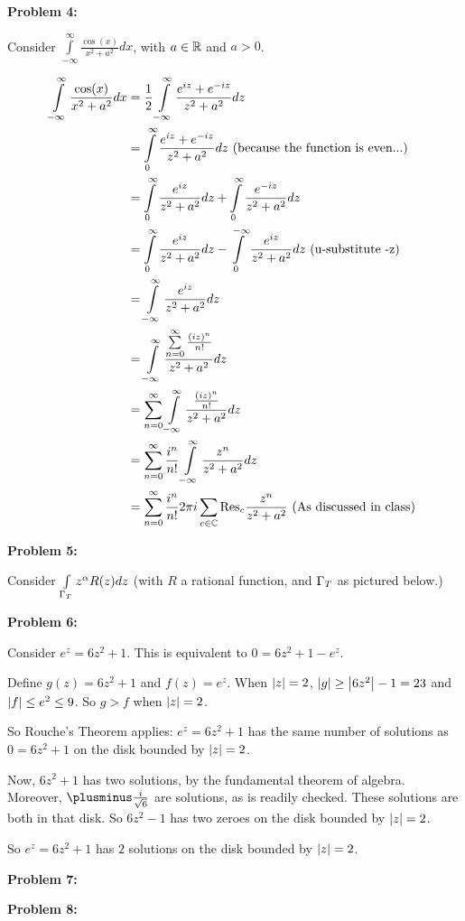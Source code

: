 \documentclass[a4paper,12pt]{article}
\begin{document}
\shunt

{\bf Problem 4:}

Consider $\int\limits_{-\infty}^\infty \frac{\cos(x)}{x^2+a^2} dx$, with $a \in \mathbb{R}$ and $a > 0$.

\begin{align*}
\int\limits_{-\infty}^\infty \frac{\cos(x)}{x^2+a^2} dx &= \frac{1}{2} \int\limits_{-\infty}^\infty \frac{e^{iz}+e^{-iz}}{z^2+a^2}dz\\
&=\int\limits_{0}^\infty \frac{e^{iz}+e^{-iz}}{z^2+a^2}dz \text{ (because the function is even...)}\\
&= \int\limits_{0}^\infty \frac{e^{iz}}{z^2+a^2}dz + \int\limits_{0}^\infty \frac{e^{-iz}}{z^2+a^2}dz\\
&= \int\limits_{0}^\infty \frac{e^{iz}}{z^2+a^2}dz - \int\limits_{0}^{-\infty} \frac{e^{iz}}{z^2+a^2}dz \text{ (u-substitute -z)} \\
&= \int\limits_{-\infty}^\infty \frac{e^{iz}}{z^2+a^2}dz \\
&= \int\limits_{-\infty}^\infty \frac{\sum\limits_{n=0}^\infty \frac{(iz)^n}{n!}}{z^2+a^2}dz \\
&= \sum\limits_{n=0}^\infty \int\limits_{-\infty}^\infty \frac{\frac{(iz)^n}{n!}}{z^2+a^2}dz \\
&= \sum\limits_{n=0}^\infty \frac{i^n}{n!} \int\limits_{-\infty}^\infty \frac{z^n}{z^2+a^2}dz \\
&= \sum\limits_{n=0}^\infty \frac{i^n}{n!} 2\pi i \sum\limits_{c \in \mathbb{C}} \text{Res}_c \frac{z^n}{z^2+a^2} \text{ (As discussed in class) } \\
\end{align*} %

\shunt

{\bf Problem 5:}

Consider $\int\limits_{\Gamma_T} z^\alpha R(z) dz$ (with $R$ a rational function, and $\Gamma_T$ as pictured below.)

\shunt %



\shunt

{\bf Problem 6:}

Consider $e^z = 6z^2 + 1$. This is equivalent to $0=6z^2 + 1 -e^z$.

Define $g(z) = 6z^2 +1$ and $f(z) = e^z$. When $\left\lvert z \right\rvert = 2$, $\left\lvert g \right\rvert \geq \left\lvert 6z^2 \right\rvert -1 = 23$ and $\left\lvert f \right\rvert \leq e^2 \leq 9$. So $g>f$ when $\left\lvert z \right\rvert = 2$.

So Rouche's Theorem applies: $e^z = 6z^2 +1$ has the same number of solutions as $0=6z^2 +1$ on the disk bounded by $\left\lvert z \right\rvert = 2$.

Now, $6z^2 +1$ has two solutions, by the fundamental theorem of algebra. Moreover, $\plusminus \frac{i}{\sqrt{6}}$ are solutions, as is readily checked. These solutions are both in that disk. So $6z^2-1$ has two zeroes on the disk bounded by $\left\lvert z \right\rvert = 2$.

So  $e^z = 6z^2 +1$ has $2$ solutions on the disk bounded by $\left\lvert z \right\rvert = 2$.

\shunt

{\bf Problem 7:}

\shunt

{\bf Problem 8:}

\shunt
\end{document}
